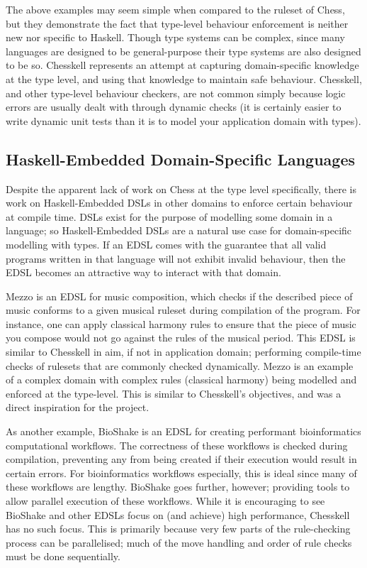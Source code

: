 \documentclass[12pt, a4paper, bibliography=totocnumbered]{scrreprt}
\begin{document}
The above examples may seem simple when compared to the ruleset of Chess, but they demonstrate the fact that type-level behaviour enforcement is neither new nor specific to Haskell. Though type systems can be complex, since many languages are designed to be general-purpose their type systems are also designed to be so. Chesskell represents an attempt at capturing domain-specific knowledge at the type level, and using that knowledge to maintain safe behaviour. Chesskell, and other type-level behaviour checkers, are not common simply because logic errors are usually dealt with through dynamic checks (it is certainly easier to write dynamic unit tests than it is to model your application domain with types).

\subsection{Haskell-Embedded Domain-Specific Languages}

Despite the apparent lack of work on Chess at the type level specifically, there is work on Haskell-Embedded DSLs in other domains to enforce certain behaviour at compile time. DSLs exist for the purpose of modelling some domain in a language; so Haskell-Embedded DSLs are a natural use case for domain-specific modelling with types. If an EDSL comes with the guarantee that all valid programs written in that language will not exhibit invalid behaviour, then the EDSL becomes an attractive way to interact with that domain.

Mezzo \cite{mezzohaskellsymposium} is an EDSL for music composition, which checks if the described piece of music conforms to a given musical ruleset during compilation of the program. For instance, one can apply classical harmony rules to ensure that the piece of music you compose would not go against the rules of the musical period. This EDSL is similar to Chesskell in aim, if not in application domain; performing compile-time checks of rulesets that are commonly checked dynamically. Mezzo is an example of a complex domain with complex rules (classical harmony) being modelled and enforced at the type-level. This is similar to Chesskell's objectives, and was a direct inspiration for the project.

As another example, BioShake \cite{bioshake} is an EDSL for creating performant bioinformatics computational workflows. The correctness of these workflows is checked during compilation, preventing any from being created if their execution would result in certain errors. For bioinformatics workflows especially, this is ideal since many of these workflows are lengthy. BioShake goes further, however; providing tools to allow parallel execution of these workflows. While it is encouraging to see BioShake and other EDSLs \cite{aplite} focus on (and achieve) high performance, Chesskell has no such focus. This is primarily because very few parts of the rule-checking process can be parallelised; much of the move handling and order of rule checks must be done sequentially.
\end{document}

